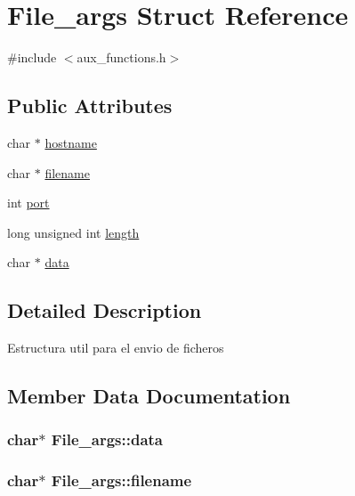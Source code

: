 \hypertarget{struct_file__args}{}\section{File\+\_\+args Struct Reference}
\label{struct_file__args}


{\ttfamily \#include $<$aux\+\_\+functions.\+h$>$}

\subsection*{Public Attributes}
\begin{DoxyCompactItemize}
\item 
char $\ast$ \hyperlink{struct_file__args_a9aa177aea3a099397a09131a92f30115}{hostname}
\item 
char $\ast$ \hyperlink{struct_file__args_ad24dfcb255f29ee677793a0051c7336b}{filename}
\item 
int \hyperlink{struct_file__args_a83e78eb2ebacdc7e63eca61d1340fa61}{port}
\item 
long unsigned int \hyperlink{struct_file__args_a3168e8734e7ad263d88a6da49b4aff20}{length}
\item 
char $\ast$ \hyperlink{struct_file__args_a0fda96130bd2c0d56e9508b37fb822a2}{data}
\end{DoxyCompactItemize}


\subsection{Detailed Description}
Estructura util para el envio de ficheros 

\subsection{Member Data Documentation}
\subsubsection[{\texorpdfstring{data}{data}}]{\setlength{\rightskip}{0pt plus 5cm}char$\ast$ File\+\_\+args\+::data}\hypertarget{struct_file__args_a0fda96130bd2c0d56e9508b37fb822a2}{}\label{struct_file__args_a0fda96130bd2c0d56e9508b37fb822a2}
\subsubsection[{\texorpdfstring{filename}{filename}}]{\setlength{\rightskip}{0pt plus 5cm}char$\ast$ File\+\_\+args\+::filename}\hypertarget{struct_file__args_ad24dfcb255f29ee677793a0051c7336b}{}\label{struct_file__args_ad24dfcb255f29ee677793a0051c7336b}
